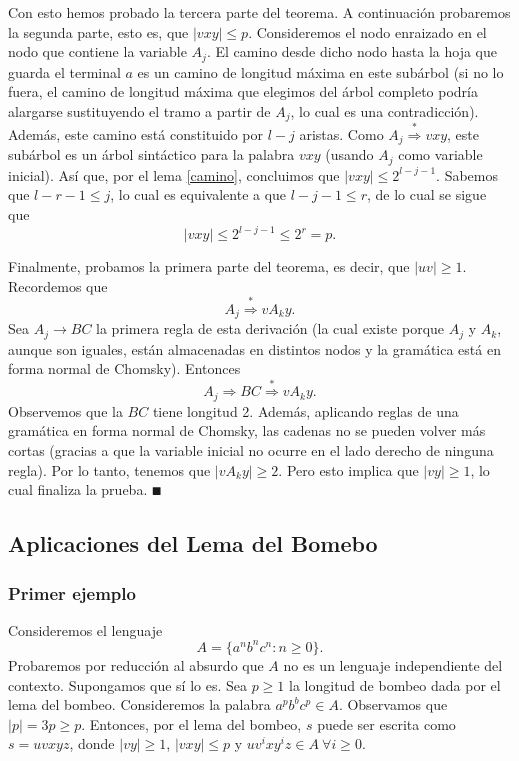 \documentclass[twoside]{article}
\newcommand{\derive}{\overset{*}{\Rightarrow}}
\begin{document}
\begin{dem}
Con esto hemos probado la tercera parte del teorema. A continuación probaremos la segunda parte, esto es, que $|vxy|\leq p$. Consideremos el nodo enraizado en el nodo que contiene la variable $A_j$. El camino desde dicho nodo hasta la hoja que guarda el terminal $a$ es un camino de longitud máxima en este subárbol (si no lo fuera, el camino de longitud máxima que elegimos del árbol completo podría alargarse sustituyendo el tramo a partir de $A_j$, lo cual es una contradicción). Además, este camino está constituido por $l-j$ aristas. Como $A_j\derive vxy$, este subárbol es un árbol sintáctico para la palabra $vxy$ (usando $A_j$ como variable inicial). Así que, por el lema \ref{camino}, concluimos que $|vxy|\leq 2^{l-j-1}$. Sabemos que $l-r-1\leq j$, lo cual es equivalente a que $l-j-1\leq r$, de lo cual se sigue que
$$|vxy|\leq 2^{l-j-1}\leq 2^r=p.$$

Finalmente, probamos la primera parte del teorema, es decir, que $|uv|\geq 1$. Recordemos que
$$A_j\derive vA_ky.$$
Sea $A_j\to BC$ la primera regla de esta derivación (la cual existe porque $A_j$ y $A_k$, aunque son iguales, están almacenadas en distintos nodos y la gramática está en forma normal de Chomsky). Entonces
$$A_j\Rightarrow BC\derive vA_ky.$$
Observemos que la $BC$ tiene longitud 2. Además, aplicando reglas de una gramática en forma normal de Chomsky, las cadenas no se pueden volver más cortas (gracias a que la variable inicial no ocurre en el lado derecho de ninguna regla). Por lo tanto, tenemos que $|vA_ky|\geq 2$. Pero esto implica que $|vy|\geq 1$, lo cual finaliza la prueba.
$\QED$
\end{dem}

\subsection{Aplicaciones del Lema del Bomebo}
\subsubsection{Primer ejemplo}
Consideremos el lenguaje $$A=\{a^nb^nc^n: n\geq 0\}.$$
Probaremos por reducción al absurdo que $A$ no es un lenguaje independiente del contexto. Supongamos que sí lo es. Sea $p\geq 1$ la longitud de bombeo dada por el lema del bombeo. Consideremos la palabra $a^pb^bc^p\in A$. Observamos que $|p|=3p\geq p$. Entonces, por el lema del bombeo, $s$ puede ser escrita como $s=uvxyz$, donde $|vy|\geq 1$, $|vxy|\leq p$ y $uv^ixy^iz\in A\ \forall i\geq 0$. 
\end{document}
